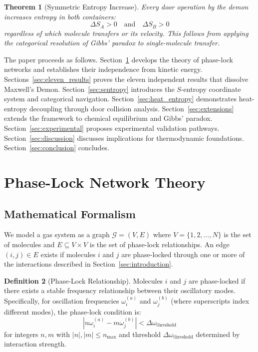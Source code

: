 \documentclass[twocolumn,showpacs,preprintnumbers,amsmath,amssymb,prd]{revtex4-2}
\newtheorem{theorem}{Theorem}[section]
\theoremstyle{definition}
\newtheorem{definition}[theorem]{Definition}
\theoremstyle{remark}
\newcommand{\phaselockgraph}{\mathcal{G}}
\begin{document}
\begin{theorem}[Symmetric Entropy Increase]
\label{thm:symmetric_entropy}
Every door operation by the demon increases entropy in both containers:
\begin{equation}
\Delta S_A > 0 \quad \text{and} \quad \Delta S_B > 0
\label{eq:symmetric_entropy}
\end{equation}
regardless of which molecule transfers or its velocity. This follows from applying the categorical resolution of Gibbs' paradox to single-molecule transfer.
\end{theorem}

The paper proceeds as follows. Section~\ref{sec:phase_lock} develops the theory of phase-lock networks and establishes their independence from kinetic energy. Sections~\ref{sec:eleven_results} proves the eleven independent results that dissolve Maxwell's Demon. Section~\ref{sec:sentropy} introduces the $S$-entropy coordinate system and categorical navigation. Section~\ref{sec:heat_entropy} demonstrates heat-entropy decoupling through door collision analysis. Section~\ref{sec:extensions} extends the framework to chemical equilibrium and Gibbs' paradox. Section~\ref{sec:experimental} proposes experimental validation pathways. Section~\ref{sec:discussion} discusses implications for thermodynamic foundations. Section~\ref{sec:conclusion} concludes.

\section{Phase-Lock Network Theory}
\label{sec:phase_lock}

\subsection{Mathematical Formalism}

We model a gas system as a graph $\phaselockgraph = (V, E)$ where $V = \{1, 2, \ldots, N\}$ is the set of molecules and $E \subseteq V \times V$ is the set of phase-lock relationships. An edge $(i, j) \in E$ exists if molecules $i$ and $j$ are phase-locked through one or more of the interactions described in Section~\ref{sec:introduction}.

\begin{definition}[Phase-Lock Relationship]
\label{def:phase_lock}
Molecules $i$ and $j$ are phase-locked if there exists a stable frequency relationship between their oscillatory modes. Specifically, for oscillation frequencies $\omega_i^{(a)}$ and $\omega_j^{(b)}$ (where superscripts index different modes), the phase-lock condition is:
\begin{equation}
\left| n\omega_i^{(a)} - m\omega_j^{(b)} \right| < \Delta\omega_{\text{threshold}}
\label{eq:phase_lock_condition}
\end{equation}
for integers $n, m$ with $|n|, |m| \leq n_{\max}$ and threshold $\Delta\omega_{\text{threshold}}$ determined by interaction strength.
\end{definition}
\end{document}
